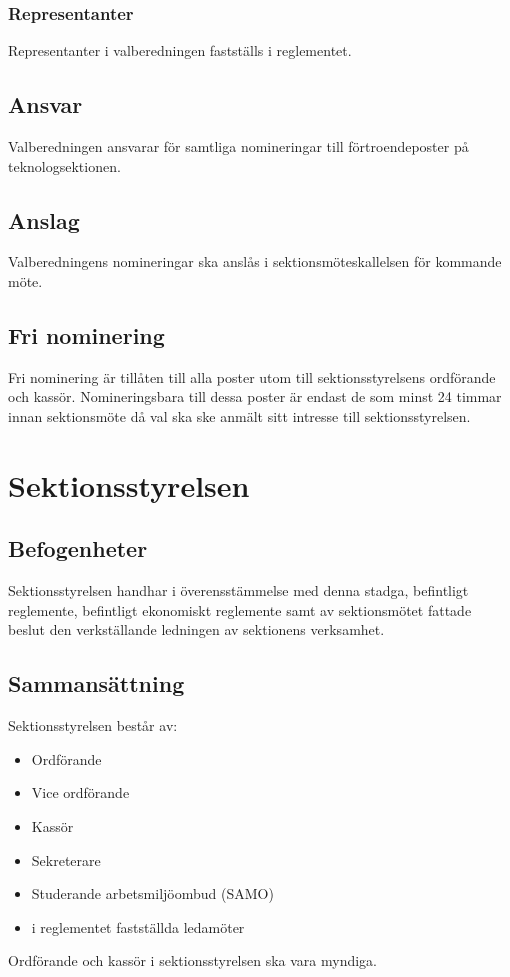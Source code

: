 \documentclass[a4paper]{dtek}
\begin{document}
\subsubsection{Representanter}
Representanter i valberedningen fastställs i reglementet.
\subsection{Ansvar}
Valberedningen ansvarar för samtliga nomineringar till förtroendeposter på teknologsektionen.
\subsection{Anslag}
Valberedningens nomineringar ska anslås i sektionsmöteskallelsen för kommande möte.
\subsection{Fri nominering}
Fri nominering är tillåten till alla poster utom till sektionsstyrelsens ordförande och kassör. Nomineringsbara till dessa poster är endast de som minst 24 timmar innan sektionsmöte då val ska ske anmält sitt intresse till sektionsstyrelsen.
\newpage

\section{Sektionsstyrelsen}
\subsection{Befogenheter}
Sektionsstyrelsen handhar i överensstämmelse med denna stadga, befintligt reglemente, befintligt ekonomiskt reglemente samt av sektionsmötet fattade beslut den verkställande ledningen av sektionens verksamhet.
\subsection{Sammansättning}
Sektionsstyrelsen består av:
\begin{itemize}
\item Ordförande
\item Vice ordförande
\item Kassör
\item Sekreterare
\item Studerande arbetsmiljöombud (SAMO)
\item i reglementet fastställda ledamöter
\end{itemize}
Ordförande och kassör i sektionsstyrelsen ska vara myndiga.
\end{document}
